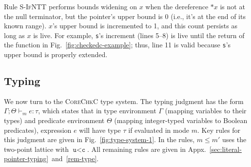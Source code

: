 \documentclass[conference]{IEEEtran}
\newcommand{\code}[1]{\lstinline|#1|}
\newcommand{\lang}{\textsc{CoreChkC}\xspace}
\newcommand{\estar}[1]{\ensuremath{\texttt{*}{#1}}}
\newcommand{\cmode}{\texttt{c}}
\newcommand{\umode}{\texttt{u}}
\begin{document}
Rule \textsc{S-IfNTT} performs bounds widening on $x$ when the
dereference $\estar{x}$ is not at the null terminator, but the
pointer's upper bound is 0 (i.e., it's at the end of its known
range). $x$'s upper bound is incremented to 1, and this count persists
as long as $x$ is live.  For example, \code{s}'s increment (lines
5--8) is live until the return of the function in
Fig.~\ref{fig:checkedc-example}; thus, line 11 is valid because
\code{s}'s upper bound is properly extended. 









\subsection{Typing}\label{sec:type-system}



We now turn to the \lang type system.
The typing judgment has the form $\Gamma;\Theta\vdash_m e : \tau$,
which states that in type environment $\Gamma$ (mapping variables to
their types) and predicate environment $\Theta$ (mapping integer-typed
variables to Boolean predicates), expression $e$ will have type $\tau$ if evaluated
in mode $m$. Key rules for this judgment are given in
Fig.~\ref{fig:type-system-1}. In the rules, $m \le m'$ uses
the two-point lattice with $\umode < \cmode$. All remaining rules
  are given in Appx.~\ref{sec:literal-pointer-typing}~and~\ref{rem-type}.
\end{document}

